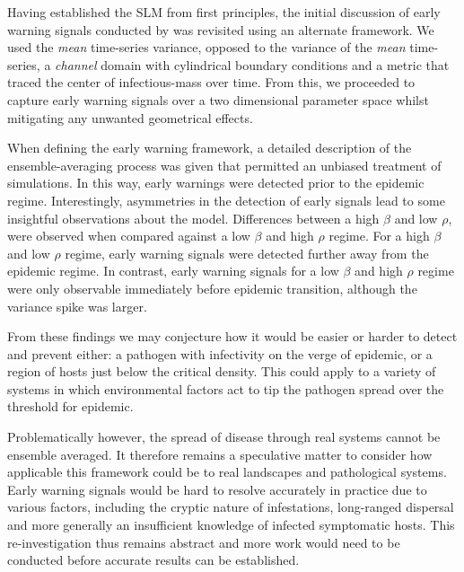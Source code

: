 Having established the SLM from first principles, the initial discussion of early warning %
signals conducted by \cite{OROZCOFUENTES201912} was revisited using an alternate framework. %
% 
We used the \textit{mean} time-series variance, opposed to the variance of the \textit{mean} %
time-series, a \textit{channel} domain with cylindrical boundary conditions and a metric that %
traced the center of infectious-mass over time. From this, we proceeded to capture early warning %
signals over a two dimensional parameter space whilst mitigating any unwanted geometrical effects. %

When %
defining the early warning framework, a detailed description of the ensemble-averaging process %
was given that permitted an unbiased treatment of simulations. %
In this way, early warnings %
were detected prior to the epidemic regime. Interestingly, asymmetries %
in the detection of early %
 signals lead to some insightful observations about the model. %
 Differences between a high $\beta$ and low $\rho$, were observed when compared against a low $\beta$ %
 and high $\rho$ regime. For a high $\beta$ and low $\rho$ regime, early warning signals were detected %
 further away from the epidemic regime. %
 In contrast, early warning signals for a low $\beta$ and high $\rho$ regime were only %
 observable immediately before epidemic transition, although the variance spike was larger. %

From these findings we may conjecture how it would be easier or harder to detect and prevent %
either: a pathogen with infectivity on the verge of epidemic, or a region of hosts just below %
the critical density. %
This could apply to a variety of systems in which environmental factors act to tip the pathogen %
spread over the threshold for epidemic. %

Problematically however, the spread of disease through real systems cannot be ensemble averaged. %
It therefore remains a speculative matter to consider how applicable this framework could be to %
real landscapes and pathological systems. Early warning signals would be hard to resolve accurately in %
practice due to various factors, including the cryptic nature of infestations, %
long-ranged dispersal and more generally an insufficient knowledge of infected symptomatic hosts. %
This re-investigation thus remains abstract and more work would need to be conducted before %
accurate results can be established. %

\newpage